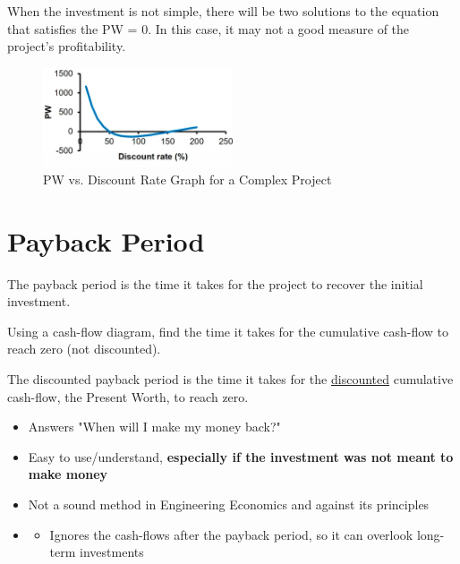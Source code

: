 \begin{proposition}
    When the investment is not simple, there will be two solutions to the equation that satisfies the PW = 0. In this case, it may not a good measure of the project's profitability.
\end{proposition}

\begin{figure}[H]
    \centering
    \includegraphics[width=0.5\textwidth]{LECTURE_6/not-simple.png}
    \caption{PW vs. Discount Rate Graph for a Complex Project}
\end{figure}

\section{Payback Period}


\begin{definition}
    The payback period is the time it takes for the project to recover the initial investment.
\end{definition}

\begin{theorem}
    Using a cash-flow diagram, find the time it takes for the cumulative cash-flow to reach zero (not discounted).
\end{theorem}

\begin{theorem}
    The discounted payback period is the time it takes for the \underline{discounted} cumulative cash-flow, the Present Worth, to reach zero.
\end{theorem}

\begin{proposition}
    \begin{itemize}
        \item Answers "When will I make my money back?"
        \item Easy to use/understand, \textbf{especially if the investment was not meant to make money}
        \item Not a sound method in Engineering Economics and against its principles
        \item[] \begin{itemize}
                  \item Ignores the cash-flows after the payback period, so it can overlook long-term investments
              \end{itemize}
    \end{itemize}
\end{proposition}

